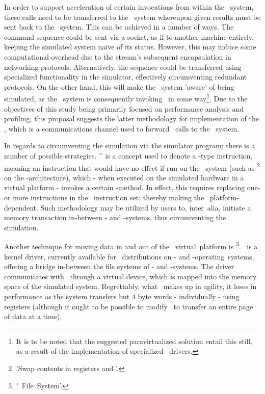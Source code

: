 In order to support acceleration of certain invocations from within the \termtarget\ system, these calls need to be transferred to the \termhost\ system whereupon given results must be sent back to the \termtarget\ system.
This can be achieved in a number of ways.
The command sequence could be sent via a socket, as if to another machine entirely, keeping the simulated system naïve of its status.
However, this may induce some computational overhead due to the stream's subsequent encapsulation in networking protocols.
Alternatively, the sequence could be transferred using specialized functionality in the simulator, effectively circumventing redundant protocols.
On the other hand, this will make the \termtarget\ system 'aware' of being simulated, as the \termtarget\ system is consequently invoking \termsimics\ in some way\footnote{It is to be noted that the suggested paravirtualized solution entail this still, as a result of the implementation of specialized \termopengles\ drivers.}.
Due to the objectives of this study being primarily focused on performance analysis and profiling, this proposal suggests the latter methodology for implementation of the \termsimicspipe , which is a communications channel used to forward \termapi\ calls to the \termhost\ system.

In regards to circumventing the simulation via the simulator program; there is a number of possible strategies.
'\termmagicinstr ' is a concept used to denote a -type instruction, meaning an instruction that would have no effect if run on the \termtarget\ system (such as \footnote{'Swap contents in registers  and '.} on the \termxeightysix -architecture), which - when executed on the simulated hardware in a virtual platform - invokes a certain \termcallback -method.
In effect, this requires replacing one- or more instructions in the \termtarget\ instruction set; thereby making the \termmagicinstr\ platform-dependent.
Such methodology may be utilized by users to, inter~alia, initiate a memory transaction in-between \termtarget - and \termhost -systems, thus circumventing the simulation.

Another technique for moving data in and out of the \termsimics\ virtual~platform is \termfs \footnote{'\termsimics ~File~System'.}.
\termfs\ is a kernel driver, currently available for \termsimics\ distributions on \termlinux - and \termsolaris -operating~systems, offering a bridge in-between the file systems of \termtarget - and \termhost -systems.
The driver communicates with \termsimics\ through a virtual device, which is mapped into the memory space of the simulated system.
Regrettably, what \termfs\ makes up in agility, it loses in performance as the system transfers but $4$ byte words - individually - using registers (although it ought to be possible to modify \termfs\ to transfer an entire page of data at a time).

